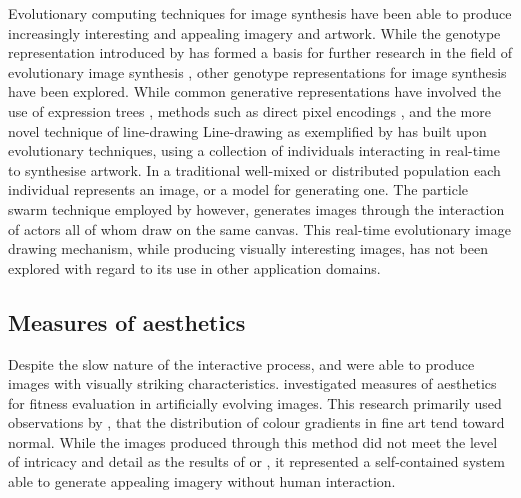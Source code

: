 \documentclass{article}
\begin{document}
Evolutionary computing techniques for image synthesis have been able to produce increasingly interesting and appealing imagery and artwork.
While the genotype representation introduced by \citet{sims} has formed a basis for further research in the field of evolutionary image synthesis \citep{den2011evolving,den2010using,nevar,den2012maintaining,distributed-evolutionary-art}, other genotype representations for image synthesis have been explored.
While common generative representations have involved the use of expression trees \citep{sims,nevar,aesthetic-measures}, methods such as direct pixel encodings \citep{nguyen2015deep}, and the more novel technique of line-drawing \citep{annunziato1998nagual,niche-reproduction}
Line-drawing as exemplified by \citet{niche-reproduction} has built upon evolutionary techniques, using a collection of individuals interacting in real-time to synthesise artwork.
In a traditional well-mixed \citep{sims} or distributed population \citep{distributed-evolutionary-art} each individual represents an image, or a model for generating one.
The particle swarm technique employed by \citet{niche-reproduction} however, generates images through the interaction of actors all of whom draw on the same canvas.
This real-time evolutionary image drawing mechanism, while producing visually interesting images, has not been explored with regard to its use in other application domains.


\subsection{Measures of aesthetics}

Despite the slow nature of the interactive process, \citet{sims} and \citet{nevar} were able to produce images with visually striking characteristics.
\citet{aesthetic-measures} investigated measures of aesthetics for fitness evaluation in artificially evolving images.
This research primarily used observations by \citet{ralph-bell-curve}, that the distribution of colour gradients in fine art tend toward normal.
While the images produced through this method did not meet the level of intricacy and detail as the results of \citet{sims} or \citet{nevar}, it represented a self-contained system able to generate appealing imagery without human interaction.
\end{document}
